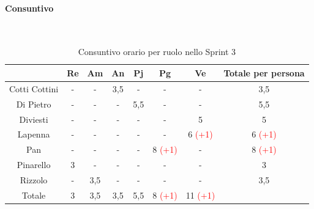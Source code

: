 \documentclass{article}
\begin{document}
                \paragraph{Consuntivo}\mbox{}\\
                \begin{table}[H]
                    \centering
                    \begin{tabular}{|c|c|c|c|c|c|c|c|}
                    \hline
                                  & Re  & Am  & An  & Pj  & Pg  & Ve  & Totale per persona \\ \hline
                    Cotti Cottini & -   & -   & 3,5 & -   & -   & -   & 3,5                \\ \hline
                    Di Pietro     & -   & -   & -   & 5,5 & -   & -   & 5,5                \\ \hline
                    Diviesti      & -   & -   & -   & -   & -   & 5   & 5                  \\ \hline
                    Lapenna       & -   & -   & -   & -   & -   & 6 \textcolor{red}{(+1)}   & 6 \textcolor{red}{(+1)}                  \\ \hline
                    Pan           & -   & -   & -   & -   & 8 \textcolor{red}{(+1)}  & -   & 8 \textcolor{red}{(+1)}                 \\ \hline
                    Pinarello     & 3   & -   & -   & -   & -   & -   & 3                  \\ \hline
                    Rizzolo       & -   & 3,5 & -   & -   & -   & -   & 3,5                \\ \hline
                    Totale        & 3   & 3,5 & 3,5 & 5,5 & 8 \textcolor{red}{(+1)}  & 11 \textcolor{red}{(+1)}  &                    \\ \hline
                    \end{tabular}
                    \caption{Consuntivo orario per ruolo nello Sprint 3}
                \end{table}

\end{document}

